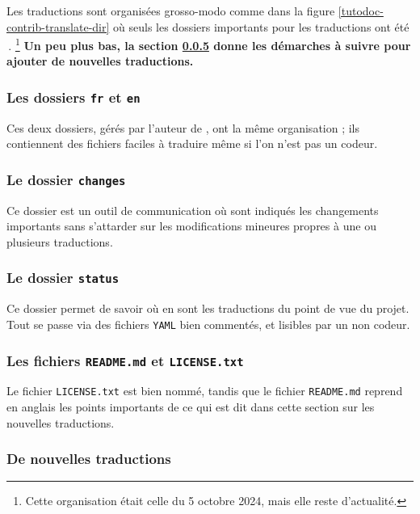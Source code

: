 Les traductions sont organisées grosso-modo comme dans la figure \ref{tutodoc-contrib-translate-dir} où seuls les dossiers importants pour les traductions ont été \,.%
\footnote{
    Cette organisation était celle du 5 octobre 2024, mais elle reste d'actualité.
}
\textbf{Un peu plus bas, la section \ref{tutodoc-contrib-translate} donne les démarches à suivre pour ajouter de nouvelles traductions.}


\subsubsection{Les dossiers \texttt{fr} et \texttt{en}}

Ces deux dossiers, gérés par l'auteur de \thisproj, ont la même organisation ; ils contiennent des fichiers faciles à traduire même si l'on n'est pas un codeur.


\subsubsection{Le dossier \texttt{changes}}

Ce dossier est un outil de communication où sont indiqués les changements importants sans s'attarder sur les modifications mineures propres à une ou plusieurs traductions.



\subsubsection{Le dossier \texttt{status}}

Ce dossier permet de savoir où en sont les traductions du point de vue du projet. Tout se passe via des fichiers \verb#YAML# bien commentés, et lisibles par un non codeur.



\subsubsection{Les fichiers \texttt{README.md} et \texttt{LICENSE.txt}}

Le fichier \texttt{LICENSE.txt} est bien nommé, tandis que le fichier \texttt{README.md} reprend en anglais les points importants de ce qui est dit dans cette section sur les nouvelles traductions.



\subsubsection{De nouvelles traductions}
\label{tutodoc-contrib-translate}

